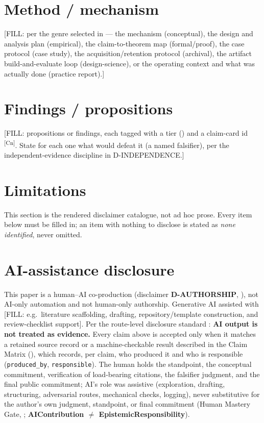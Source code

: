 \documentclass[10pt,twocolumn]{article}
\newcommand{\claimref}[1]{\textsuperscript{[#1]}}
\begin{document}
\section{Method / mechanism}
\label{sec:method}
[FILL: per the genre selected in  --- the mechanism
(conceptual), the design and analysis plan (empirical), the claim-to-theorem
map (formal/proof), the case protocol (case study), the acquisition/retention
protocol (archival), the artifact build-and-evaluate loop (design-science),
or the operating context and what was actually done (practice report).]

\section{Findings / propositions}
\label{sec:findings}
[FILL: propositions or findings, each tagged with a tier ()
and a claim-card id \claimref{Cn}. State for each one what would defeat it
(a named falsifier), per the independent-evidence discipline in
D-INDEPENDENCE.]

\section{Limitations}
\label{sec:limitations}
\label{sec:disclaimers}
This section is the rendered disclaimer catalogue, not ad hoc prose. Every
item below must be filled in; an item with nothing to disclose is stated as
\emph{none identified}, never omitted.



\section{AI-assistance disclosure}
\label{sec:ai-disclosure}
This paper is a human--AI co-production (disclaimer \textbf{D-AUTHORSHIP},
), not AI-only automation and not human-only
authorship. Generative AI assisted with [FILL: e.g.\ literature scaffolding,
drafting, repository/template construction, and review-checklist support].
Per the route-level disclosure standard \citep{lahtee2026zeroreadout}:
\textbf{AI output is not treated as evidence.} Every claim above is accepted
only when it matches a retained source record or a machine-checkable result
described in the Claim Matrix (), which records, per
claim, who produced it and who is responsible (\texttt{produced\_by},
\texttt{responsible}). The human holds the standpoint, the conceptual
commitment, verification of load-bearing citations, the falsifier judgment,
and the final public commitment; AI's role was assistive (exploration,
drafting, structuring, adversarial routes, mechanical checks, logging),
never substitutive for the author's own judgment, standpoint, or final
commitment (Human Mastery Gate, ;
\textbf{AIContribution $\neq$ EpistemicResponsibility}).
\end{document}
